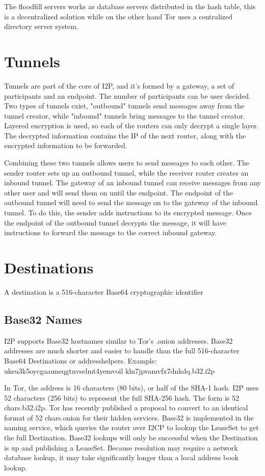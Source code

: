 \documentclass[a4paper,twocolumn,12pt]{article}
\begin{document}
The floodfill servers works as database servers distributed in the hash table, this is a decentralized solution while on the other hand Tor\cite{tor-design} uses a centralized directory server system.

\section{Tunnels}

Tunnels are part of the core of I2P, and it's formed by a gateway, a set of participants and an endpoint. The number of participants can be user decided. Two types of tunnels exist, "outbound" tunnels send messages away from the tunnel creator, while "inbound" tunnels bring messages to the tunnel creator. Layered encryption is used, so each of the routers can only decrypt a single layer. The decrypted information contains the IP of the next router, along with the encrypted information to be forwarded.

Combining these two tunnels allows users to send messages to each other. The sender router sets up an outbound tunnel, while the receiver router creates an inbound tunnel. The gateway of an inbound tunnel can receive messages from any other user and will send them on until the endpoint. The endpoint of the outbound tunnel will need to send the message on to the gateway of the inbound tunnel. To do this, the sender adds instructions to its encrypted message. Once the endpoint of the outbound tunnel decrypts the message, it will have instructions to forward the message to the correct inbound gateway.

\section{Destinations}

A destination is a 516-character Base64 cryptographic identifier

\subsection{Base32 Names}

I2P supports Base32 hostnames similar to Tor's\cite{tor-design} .onion addresses. Base32 addresses are much shorter and easier to handle than the full 516-character Base64 Destinations or addresshelpers. Example: 
ukeu3k5oycgaauneqgtnvselmt4yemvoil
kln7jpvamvfx7dnkdq.b32.i2p

In Tor\cite{tor-design}, the address is 16 characters (80 bits), or half of the SHA-1 hash.
\cite{tor-hiddenservice}
I2P uses 52 characters (256 bits) to represent the full SHA-256 hash. The form is {52 chars}.b32.i2p. Tor\cite{tor-design} has recently published a proposal to convert to an identical format of {52 chars}.onion for their hidden services. Base32 is implemented in the naming service, which queries the router over I2CP to lookup the LeaseSet to get the full Destination. Base32 lookups will only be successful when the Destination is up and publishing a LeaseSet. Because resolution may require a network database lookup, it may take significantly longer than a local address book lookup.
\end{document}
